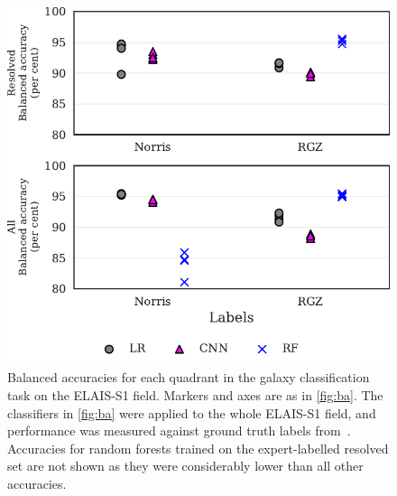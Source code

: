 \documentclass[fleqn,usenatbib,usedcolumn]{mnras}
\begin{document}
  \begin{figure}
  \centering
  \includegraphics[width=\columnwidth]{images/elais_ba_grid.pdf}
  \caption{Balanced accuracies for each quadrant in the galaxy
    classification task on the ELAIS-S1 field. Markers and axes are as in
    \autoref{fig:ba}. The classifiers in \autoref{fig:ba} were applied to the
    whole ELAIS-S1 field, and performance was measured against ground truth
    labels from~\citet{middelberg08}. Accuracies for random forests trained on
    the expert-labelled resolved set are not shown as they were considerably
    lower than all other accuracies.
    \label{fig:elais-ba}}
  \end{figure}
\end{document}
